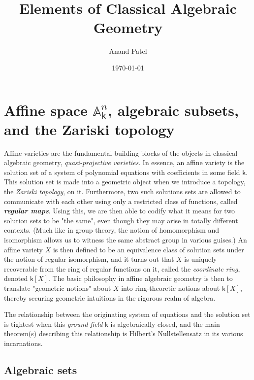 \documentclass[11pt]{article}
\author{Anand Patel}
\date{\today}
\title{Elements of Classical Algebraic Geometry}
\newcommand{\A}{\mathbb{A}}
\renewcommand{\k}{\mathsf{k}}
\newcommand{\A}{\mathbb A}
\renewcommand{\k}{\mathsf{k}}
\begin{document}
\maketitle

\section{Affine space \(\A^n_{\k}\), algebraic subsets, and the Zariski topology}
\label{sec:org6d41ec3}


Affine varieties are the fundamental building blocks of the objects in classical algebraic geometry, \emph{quasi-projective varieties}.  In essence, an affine variety is the  solution set of a system of polynomial equations with coefficients in some field \(\k\). This solution set is made into a geometric object when we introduce a topology, the \emph{Zariski topology}, on it.  Furthermore, two such solutions sets are allowed to communicate with each other using only a restricted class of functions, called \textbf{\emph{regular maps}}.  Using this, we are then able to codify what it means for two solution sets to be "the same", even though they may arise in totally different contexts.  (Much like in group theory, the notion of homomorphism and isomorphism allows us to witness the same abstract group in various guises.)  An affine variety \(X\) is then defined to be an equivalence class of solution sets under the notion of regular isomorphism, and it turns out that \(X\) is uniquely recoverable from the ring of regular functions on it, called the \emph{coordinate ring}, denoted \(\k[X]\).  The basic philosophy in affine algebraic geometry is then to translate "geometric notions" about \(X\) into ring-theoretic notions about \(\k[X]\), thereby securing geometric intuitions in the rigorous realm of algebra.

The relationship between the originating system of equations and the solution set is tightest when this \emph{ground field} \(\k\) is algebraically closed, and the main theorem(s) describing this relationship is Hilbert's Nullstellensatz in its various incarnations.  

\subsection{Algebraic sets}
\label{sec:orgf9f80b5}
\end{document}
